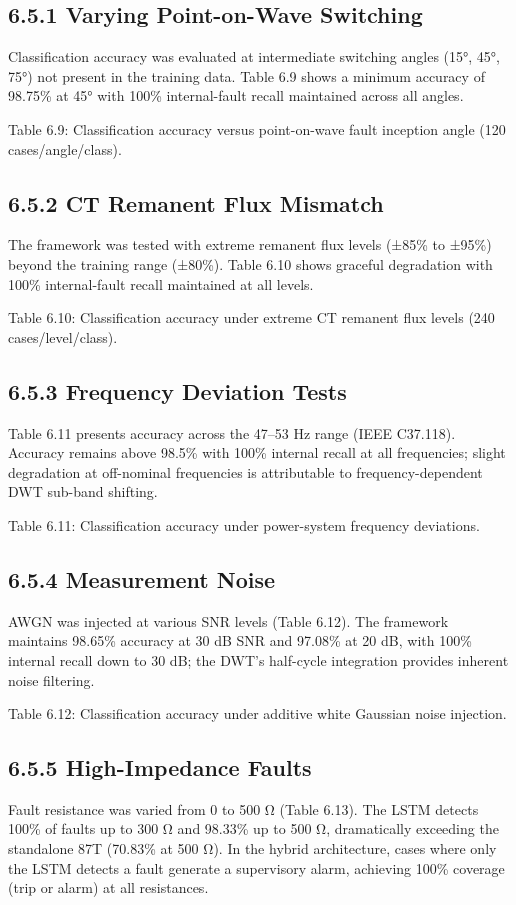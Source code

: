 \subsection{6.5.1  Varying Point-on-Wave Switching}
Classification accuracy was evaluated at intermediate switching angles (15°, 45°, 75°) not present in the training data. Table 6.9 shows a minimum accuracy of 98.75\% at 45° with 100\% internal-fault recall maintained across all angles.

Table 6.9: Classification accuracy versus point-on-wave fault inception angle (120 cases/angle/class).


\subsection{6.5.2  CT Remanent Flux Mismatch}
The framework was tested with extreme remanent flux levels (±85\% to ±95\%) beyond the training range (±80\%). Table 6.10 shows graceful degradation with 100\% internal-fault recall maintained at all levels.

Table 6.10: Classification accuracy under extreme CT remanent flux levels (240 cases/level/class).


\subsection{6.5.3  Frequency Deviation Tests}
Table 6.11 presents accuracy across the 47--53 Hz range (IEEE C37.118). Accuracy remains above 98.5\% with 100\% internal recall at all frequencies; slight degradation at off-nominal frequencies is attributable to frequency-dependent DWT sub-band shifting.

Table 6.11: Classification accuracy under power-system frequency deviations.


\subsection{6.5.4  Measurement Noise}
AWGN was injected at various SNR levels (Table 6.12). The framework maintains 98.65\% accuracy at 30 dB SNR and 97.08\% at 20 dB, with 100\% internal recall down to 30 dB; the DWT's half-cycle integration provides inherent noise filtering.

Table 6.12: Classification accuracy under additive white Gaussian noise injection.


\subsection{6.5.5  High-Impedance Faults}
Fault resistance was varied from 0 to 500 Ω (Table 6.13). The LSTM detects 100\% of faults up to 300 Ω and 98.33\% up to 500 Ω, dramatically exceeding the standalone 87T (70.83\% at 500 Ω). In the hybrid architecture, cases where only the LSTM detects a fault generate a supervisory alarm, achieving 100\% coverage (trip or alarm) at all resistances.

